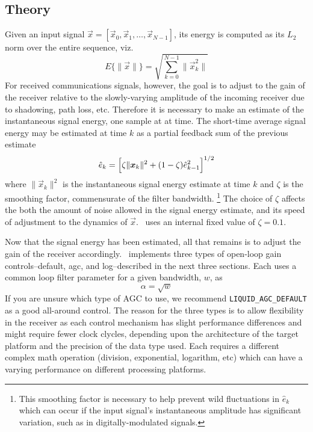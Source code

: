 \subsection{Theory}
\label{module:agc:theory}
Given an input signal
$\vec{x} = [\vec{x}_0, \vec{x}_1, \ldots, \vec{x}_{N-1}]$,
its energy is computed as its $L_2$ norm over the entire sequence, viz.
\[
    E\{ \|\vec{x}\| \} = 
        \sqrt{
            \sum\limits_{k=0}^{N-1} {\|\vec{x}_k^2\|}
        }
\]
For received communications signals, however, the goal is to adjust to the
gain of the receiver relative to the slowly-varying amplitude of the incoming
receiver due to shadowing, path loss, etc.
Therefore it is necessary to make an estimate of the instantaneous signal
energy, one sample at at time.
The short-time average signal energy may be estimated at time $k$ as a partial
feedback sum of the previous estimate
\begin{equation}
\label{eq:module:agc:ehat}
    \hat{e}_k =
        \Bigl[
            \zeta\|\vec{x}_k\|^2 + (1-\zeta)\hat{e}_{k-1}^2
        \Bigr]^{1/2}
\end{equation}
where $\| \vec{x}_k \|^2$ is the instantaneous signal energy estimate at time
$k$ and $\zeta$ is the smoothing factor, commensurate of the filter bandwidth.%
\footnote{This smoothing factor is necessary to help prevent wild fluctuations
in $\hat{e}_k$ which can occur if the input signal's instantaneous amplitude
has significant variation, such as in digitally-modulated signals.}
The choice of $\zeta$ affects the both the amount of noise allowed in the
signal energy estimate, and its speed of adjustment to the dynamics of
$\vec{x}$.
\liquid\ uses an internal fixed value of $\zeta=0.1$.

Now that the signal energy has been estimated, all that remains is to adjust
the gain of the receiver accordingly.
\liquid\ implements three types of open-loop gain controls--default, agc, and
log--described in the next three sections.
Each uses a common loop filter parameter for a given bandwidth, $w$, as
\[
    \alpha = \sqrt{w}
\]
If you are unsure which type of AGC to use, we recommend
{\tt LIQUID\_AGC\_DEFAULT} as a good all-around control.
The reason for the three types is to allow flexibility in the receiver as
each control mechanism has slight performance differences and might require
fewer clock clycles, depending upon the architecture of the target platform
and the precision of the data type used.
Each requires a different complex math operation (division, exponential,
logarithm, etc) which can have a varying performance on different processing
platforms.


